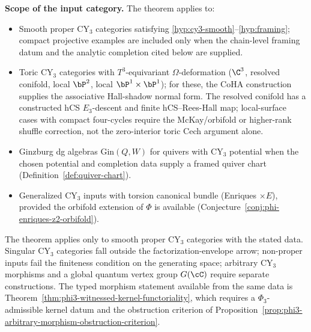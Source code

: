\begin{theorem}[\texorpdfstring{$\Phi.3$}{Phi.3}: framed object-level \texorpdfstring{$d = 3$}{d = 3} locus]
\medskip\noindent\textbf{Scope of the input category.}
The theorem applies to:
\begin{itemize}
 \item Smooth proper CY$_3$ categories satisfying \ref{hyp:cy3-smooth}--\ref{hyp:framing}; compact projective examples are included only when the chain-level framing datum and the analytic completion cited below are supplied.
 \item Toric CY$_3$ categories with $T^3$-equivariant $\Omega$-deformation ($\C^3$, resolved conifold, local $\bP^2$, local $\bP^1 \times \bP^1$); for these, the CoHA construction supplies the associative Hall-shadow normal form. The resolved conifold has a constructed hCS \(E_3\)-descent and finite hCS--Rees-Hall map; local-surface cases with compact four-cycles require the McKay/orbifold or higher-rank shuffle correction, not the zero-interior toric Cech argument alone.
 \item Ginzburg dg algebras $\mathrm{Gin}(Q, W)$ for quivers with CY$_3$ potential when the chosen potential and completion data supply a framed quiver chart (Definition~\textup{\ref{def:quiver-chart}}).
 \item Generalized CY$_3$ inputs with torsion canonical bundle (Enriques $\times E$), provided the orbifold extension of $\Phi$ is available (Conjecture~\textup{\ref{conj:phi-enriques-z2-orbifold}}).
\end{itemize}
The theorem applies only to smooth proper CY$_3$ categories with the stated data. Singular CY$_3$ categories fall outside the factorization-envelope arrow; non-proper inputs fail the finiteness condition on the generating space; arbitrary CY$_3$ morphisms and a global quantum vertex group $G(\cC)$ require separate constructions. The typed morphism statement available from the same data is Theorem~\ref{thm:phi3-witnessed-kernel-functoriality}, which requires a $\Phi_3$-admissible kernel datum and the obstruction criterion of Proposition~\ref{prop:phi3-arbitrary-morphism-obstruction-criterion}.
\end{theorem}

